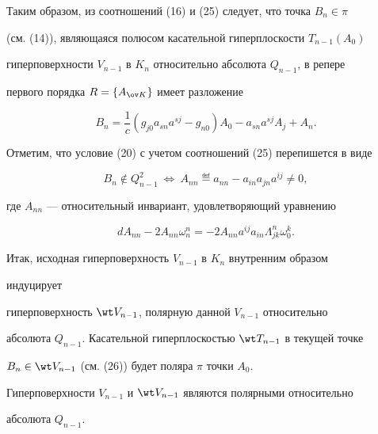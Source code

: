  


Таким образом, из соотношений (16) и (25) следует, что точка $B_n\in\pi$ 


(см. (14)), являющаяся полюсом касательной гиперплоскости $T_{n-1}(A_0)$ 


гиперповерхности $V_{n-1}$ в $K_n$ относительно абсолюта $Q_{n-1}$, в репере 


первого порядка $R=\{A_{\ov K}\}$ имеет разложение 


\begin{equation} 


B_n=\frac{1}{c}(g_{j0}a_{sn}a^{sj}-g_{n0})A_0-a_{sn}a^{sj} 


A_j+A_n. 


\end{equation} 


 


Отметим, что условие (20) с учетом соотношений (25) перепишется в виде 


\begin{equation} 


B_n\notin Q^2_{n-1}\ \Leftrightarrow\ A_{nn}\eqdef a_{nn}-a_{in}a_{jn}a^{ij}\ne0, 


\end{equation} 


где $A_{nn}$ --- относительный инвариант, удовлетворяющий уравнению 


\begin{equation} 


dA_{nn}-2A_{nn}\omega^n_n=-2A_{nn}a^{ij}a_{in}\Lambda^n_{jk}\omega^k_0. 


\end{equation} 


 


Итак, исходная гиперповерхность $V_{n-1}$ в $K_n$ внутренним образом 


индуцирует 


гиперповерхность $\wt V_{n-1}$, полярную данной $V_{n-1}$ относительно 


абсолюта $Q_{n-1}$. Касательной гиперплоскостью $\wt T_{n-1}$ в текущей точке 


$B_n\in\wt V_{n-1}$ (см. (26)) будет поляра $\pi$ точки $A_0$. 


Гиперповерхности $V_{n-1}$ и $\wt V_{n-1}$ являются полярными относительно 


абсолюта $Q_{n-1}$. 


 


